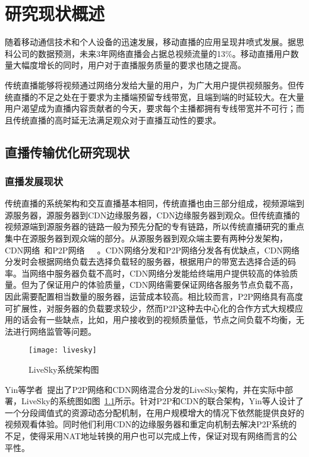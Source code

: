 \chapter{研究现状概述}
随着移动通信技术和个人设备的迅速发展，移动直播的应用呈现井喷式发展。据思科公司的数据预测，未来3年网络直播会占据总视频流量的13\%。移动直播用户数量大幅度增长的同时，用户对于直播服务质量的要求也随之提高。

传统直播能够将视频通过网络分发给大量的用户，为广大用户提供视频服务。但传统直播的不足之处在于要求为主播端预留专线带宽，且端到端的时延较大。在大量用户渴望成为直播内容贡献者的今天，要求每个主播都拥有专线带宽并不可行；而且传统直播的高时延无法满足观众对于直播互动性的要求。


\section{直播传输优化研究现状}
\subsection{直播发展现状}
传统直播的系统架构和交互直播基本相同，传统直播也由三部分组成，视频源端到源服务器，源服务器到CDN边缘服务器，CDN边缘服务器到观众。但传统直播的视频源端到源服务器的链路一般为预先分配的专有链路，所以传统直播研究的重点集中在源服务器到观众端的部分。从源服务器到观众端主要有两种分发架构，CDN网络~\cite{mukerjee2015practical}和P2P网络~\cite{liao2006anysee}~\cite{hei2007inferring}~\cite{magharei2007mesh}。CDN网络分发和P2P网络分发各有优缺点，CDN网络分发时会根据网络负载去选择负载轻的服务器，根据用户的带宽去选择合适的码率。当网络中服务器负载不高时，CDN网络分发能给终端用户提供较高的体验质量。但为了保证用户的体验质量，CDN网络需要保证网络各服务节点负载不高，因此需要配置相当数量的服务器，运营成本较高。相比较而言，P2P网络具有高度可扩展性，对服务器的负载要求较少，然而P2P这种去中心化的合作方式大规模应用的话会有一些缺点，比如，用户接收到的视频质量低，节点之间负载不均衡，无法进行网络监管等问题。

\begin{figure}[h]%
  \centering
  \texttt{[image: livesky]}
  \caption{LiveSky系统架构图~\cite{yin2009design}}
  \label{fig:livesky}
\end{figure}

Yin等学者~\cite{yin2009design}提出了P2P网络和CDN网络混合分发的LiveSky架构，并在实际中部署，LiveSky的系统图如图~\ref{fig:livesky}所示。针对P2P和CDN的联合架构，Yin等人设计了一个分段阈值式的资源动态分配机制，在用户规模增大的情况下依然能提供良好的视频观看体验。同时他们利用CDN的边缘服务器和重定向机制去解决P2P系统的不足，使得采用NAT地址转换的用户也可以完成上传，保证对现有网络而言的公平性。

